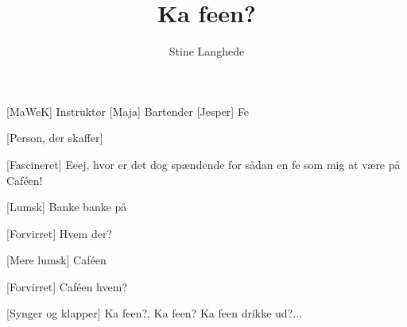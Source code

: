 \documentclass[a4paper,11pt]{article}
\title{Ka feen?}
\author{Stine Langhede}
\begin{document}
\maketitle

\begin{roles}
[MaWeK] Instruktør
[Maja] Bartender
[Jesper] Fe
\end{roles}

\begin{props}
[Person, der skaffer]
\end{props}


\begin{sketch}


[Fascineret] Eeej, hvor er det dog spændende for sådan en fe som mig at være på Caféen! 


[Lumsk] Banke banke på

[Forvirret] Hvem der?

[Mere lumsk] Caféen 

[Forvirret] Caféen hvem?


[Synger og klapper] Ka feen?, Ka feen? Ka feen drikke ud?... 


\end{sketch}
\end{document}
